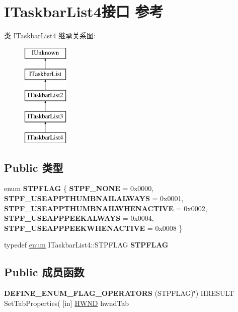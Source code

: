 \hypertarget{interface_i_taskbar_list4}{}\section{I\+Taskbar\+List4接口 参考}
\label{interface_i_taskbar_list4}
类 I\+Taskbar\+List4 继承关系图\+:\begin{figure}[H]
\begin{center}
\leavevmode
\includegraphics[height=5.000000cm]{interface_i_taskbar_list4}
\end{center}
\end{figure}
\subsection*{Public 类型}
\begin{DoxyCompactItemize}
\item 
\mbox{\label{interface_i_taskbar_list4_af5aa37d5e489fc3b7fe3877069aa406b}} 
enum {\bfseries S\+T\+P\+F\+L\+AG} \{ \newline
{\bfseries S\+T\+P\+F\+\_\+\+N\+O\+NE} = 0x0000, 
{\bfseries S\+T\+P\+F\+\_\+\+U\+S\+E\+A\+P\+P\+T\+H\+U\+M\+B\+N\+A\+I\+L\+A\+L\+W\+A\+YS} = 0x0001, 
{\bfseries S\+T\+P\+F\+\_\+\+U\+S\+E\+A\+P\+P\+T\+H\+U\+M\+B\+N\+A\+I\+L\+W\+H\+E\+N\+A\+C\+T\+I\+VE} = 0x0002, 
{\bfseries S\+T\+P\+F\+\_\+\+U\+S\+E\+A\+P\+P\+P\+E\+E\+K\+A\+L\+W\+A\+YS} = 0x0004, 
\newline
{\bfseries S\+T\+P\+F\+\_\+\+U\+S\+E\+A\+P\+P\+P\+E\+E\+K\+W\+H\+E\+N\+A\+C\+T\+I\+VE} = 0x0008
 \}
\item 
\mbox{\label{interface_i_taskbar_list4_a1aa09a1550dd356c2ab353ad42214ea6}} 
typedef \hyperlink{interfaceenum}{enum} I\+Taskbar\+List4\+::\+S\+T\+P\+F\+L\+AG {\bfseries S\+T\+P\+F\+L\+AG}
\end{DoxyCompactItemize}
\subsection*{Public 成员函数}
\begin{DoxyCompactItemize}
\item 
\mbox{\label{interface_i_taskbar_list4_a9bf5dff189ff00bea5cdcaf6f8c2d6c2}} 
{\bfseries D\+E\+F\+I\+N\+E\+\_\+\+E\+N\+U\+M\+\_\+\+F\+L\+A\+G\+\_\+\+O\+P\+E\+R\+A\+T\+O\+RS} (S\+T\+P\+F\+L\+AG)\char`\"{}) H\+R\+E\+S\+U\+LT Set\+Tab\+Properties( \mbox{[}in\mbox{]} \hyperlink{interfacevoid}{H\+W\+ND} hwnd\+Tab
\end{DoxyCompactItemize}
